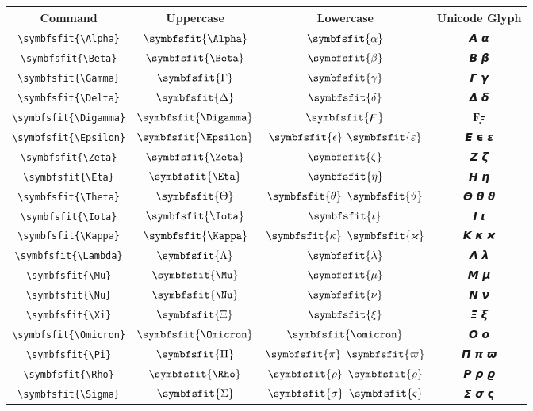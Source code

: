 \documentclass[12pt,a4paper]{article}
\begin{document}
\begin{longtable}{|c|c|c|c|}
\hline
\textbf{Command} & \textbf{Uppercase} & \textbf{Lowercase} & \textbf{Unicode Glyph} \\
\hline
\verb|\symbfsfit{\Alpha}| & $\symbfsfit{\Alpha}$ & $\symbfsfit{\alpha}$ & 𝞐 𝞪 \\
\verb|\symbfsfit{\Beta}| & $\symbfsfit{\Beta}$ & $\symbfsfit{\beta}$ & 𝞑 𝞫 \\
\verb|\symbfsfit{\Gamma}| & $\symbfsfit{\Gamma}$ & $\symbfsfit{\gamma}$ & 𝞒 𝞬 \\
\verb|\symbfsfit{\Delta}| & $\symbfsfit{\Delta}$ & $\symbfsfit{\delta}$ & 𝞓 𝞭 \\
\verb|\symbfsfit{\Digamma}| & $\symbfsfit{\Digamma}$ & $\symbfsfit{\digamma}$ & $ 𝟊 𝟋 $ \\
\verb|\symbfsfit{\Epsilon}| & $\symbfsfit{\Epsilon}$ & $\symbfsfit{\epsilon}$ $\symbfsfit{\varepsilon}$ & 𝞔 𝞊 𝞮 \\
\verb|\symbfsfit{\Zeta}| & $\symbfsfit{\Zeta}$ & $\symbfsfit{\zeta}$ & 𝞕 𝞯 \\
\verb|\symbfsfit{\Eta}| & $\symbfsfit{\Eta}$ & $\symbfsfit{\eta}$ & 𝞖 𝞰 \\
\verb|\symbfsfit{\Theta}| & $\symbfsfit{\Theta}$ & $\symbfsfit{\theta}$ $\symbfsfit{\vartheta}$ & 𝞗 𝞱 𝟅 \\
\verb|\symbfsfit{\Iota}| & $\symbfsfit{\Iota}$ & $\symbfsfit{\iota}$ & 𝞘 𝞲 \\
\verb|\symbfsfit{\Kappa}| & $\symbfsfit{\Kappa}$ & $\symbfsfit{\kappa}$ $\symbfsfit{\varkappa}$ & 𝞙 𝞳 𝟆 \\
\verb|\symbfsfit{\Lambda}| & $\symbfsfit{\Lambda}$ & $\symbfsfit{\lambda}$ & 𝞚 𝞴 \\
\verb|\symbfsfit{\Mu}| & $\symbfsfit{\Mu}$ & $\symbfsfit{\mu}$ & 𝞛 𝞵 \\
\verb|\symbfsfit{\Nu}| & $\symbfsfit{\Nu}$ & $\symbfsfit{\nu}$ & 𝞜 𝞶 \\
\verb|\symbfsfit{\Xi}| & $\symbfsfit{\Xi}$ & $\symbfsfit{\xi}$ & 𝞝 𝞷 \\
\verb|\symbfsfit{\Omicron}| & $\symbfsfit{\Omicron}$ & $\symbfsfit{\omicron}$ & 𝞞 𝞸 \\
\verb|\symbfsfit{\Pi}| & $\symbfsfit{\Pi}$ & $\symbfsfit{\pi}$ $\symbfsfit{\varpi}$ & 𝞟 𝞹 𝟉 \\
\verb|\symbfsfit{\Rho}| & $\symbfsfit{\Rho}$ & $\symbfsfit{\rho}$ $\symbfsfit{\varrho}$ & 𝞠 𝞺 𝟈 \\
\verb|\symbfsfit{\Sigma}| & $\symbfsfit{\Sigma}$ & $\symbfsfit{\sigma}$ $\symbfsfit{\varsigma}$ & 𝞢 𝞼 𝞁 \\

\end{longtable}
\end{document}
